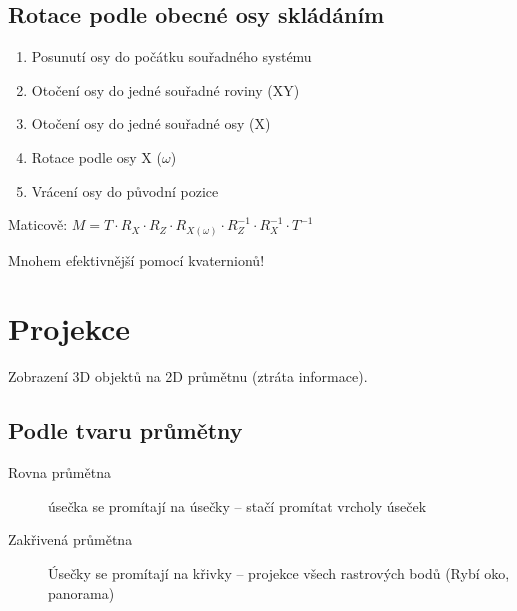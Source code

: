 \documentclass[a4paper, 11pt]{report}
\begin{document}
\subsection{Rotace podle obecné osy skládáním}
\begin{enumerate}
	\item Posunutí osy do počátku souřadného systému
	\item Otočení osy do jedné souřadné roviny (XY)
	\item Otočení osy do jedné souřadné osy (X)
	\item Rotace podle osy X ($\omega$)
	\item Vrácení osy do původní pozice
\end{enumerate}

Maticově: $M = T \cdot R_X \cdot R_Z \cdot R_{X(\omega)} \cdot R_Z^{-1} \cdot R_X^{-1} \cdot T^{-1}$

Mnohem efektivnější pomocí kvaternionů!

\section{Projekce}

Zobrazení 3D objektů na 2D průmětnu (ztráta informace).

\subsection{Podle tvaru průmětny}
\begin{description}
	\item[Rovna průmětna] úsečka se promítají na úsečky -- stačí promítat vrcholy úseček
	\item[Zakřivená průmětna] Úsečky se promítají na křivky -- projekce všech rastrových bodů (Rybí oko, panorama)
\end{description}
\end{document}
